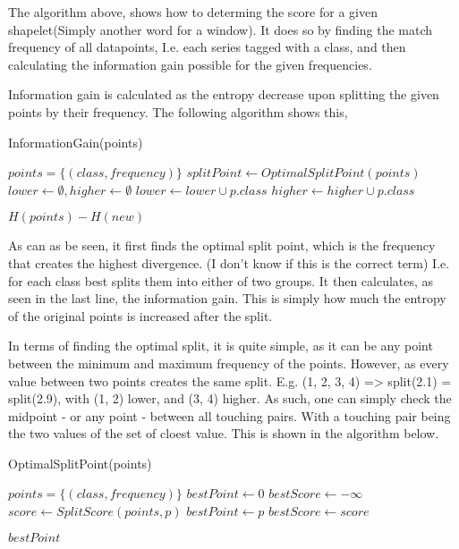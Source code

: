 \documentclass[../../main.tex]{subfiles}
\begin{document}
The algorithm above, shows how to determing the score for a given shapelet(Simply another word for a window). It does so by finding the match frequency of all datapoints, I.e. each series tagged with a class, and then calculating the information gain possible for the given frequencies.

Information gain is calculated as the entropy decrease upon splitting the given points by their frequency. The following algorithm shows this,

\begin{algorithm}
\caption{InformationGain(points)}
\begin{algorithmic}
\Require $points = \{(class, frequency)\}$
\State $splitPoint \gets OptimalSplitPoint(points)$
\State $lower \gets \emptyset, higher \gets \emptyset$
		\State $lower \gets lower \cup p.class$
	\Else
		\State $higher \gets higher \cup p.class$
	\EndIf
\EndFor

\Return $H(points) - H(new)$
\end{algorithmic}
\end{algorithm}

As can as be seen, it first finds the optimal split point, which is the frequency that creates the highest divergence. (I don't know if this is the correct term) I.e. for each class best splits them into either of two groups. It then calculates, as seen in the last line, the information gain. This is simply how much the entropy of the original points is increased after the split.

In terms of finding the optimal split, it is quite simple, as it can be any point between the minimum and maximum frequency of the points. However, as every value between two points creates the same split. E.g. (1, 2, 3, 4) => split(2.1) = split(2.9), with (1, 2) lower, and (3, 4) higher. As such, one can simply check the midpoint - or any point - between all touching pairs. With a touching pair being the two values of the set of cloest value. This is shown in the algorithm below.

\begin{algorithm}
\caption{OptimalSplitPoint(points)}
\begin{algorithmic}
\Require $points = \{(class, frequency)\}$
\State $bestPoint \gets 0$
\State $bestScore \gets -\infty$
	\State $score \gets SplitScore(points, p)$
		\State $bestPoint \gets p$
		\State $bestScore \gets score$ 
	\EndIf
\EndFor

\Return $bestPoint$
\end{algorithmic}
\end{algorithm}
\end{document}
